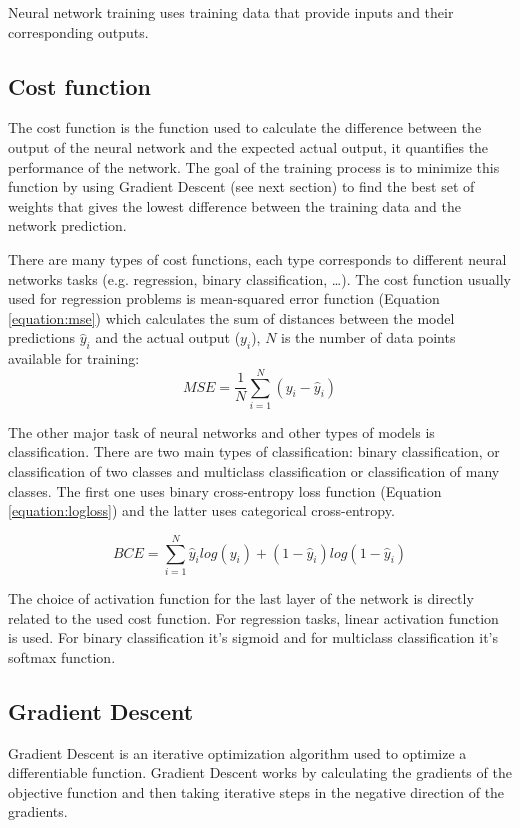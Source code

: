Neural network training uses training data that provide inputs and their corresponding outputs.

\subsection{Cost function}
The cost function is the function used to calculate the difference between the output of the neural network and the expected actual output, it quantifies the performance of the network. The goal of the training process is to minimize this function by using Gradient Descent (see next section) to find the best set of weights that gives the lowest difference between the training data and the network prediction.

There are many types of cost functions, each type corresponds to different neural networks tasks (e.g. regression, binary classification, …). The cost function usually used for regression problems is mean-squared error function (Equation \ref{equation:mse}) which calculates the sum of distances between the model predictions $\hat{y}_i$ and the actual output ($y_i$), $N$ is the number of data points available for training:
\begin{equation}
    MSE=\frac{1}{N}\sum_{i=1}^N(y_i-\hat{y}_i)
    \label{equation:mse}
\end{equation}

The other major task of neural networks and other types of models is classification. There are two main types of classification: binary classification, or classification of two classes and multiclass classification or classification of many classes. The first one uses binary cross-entropy loss function (Equation \ref{equation:logloss}) and the latter uses categorical cross-entropy.

\begin{equation}
    BCE = \sum_{i=1}^{N}\hat{y}_i log(y_i)+(1-\hat{y}_i)log(1-\hat{y}_i)
    \label{equation:logloss}
\end{equation}

The choice of activation function for the last layer of the network is directly related to the used cost function. For regression tasks, linear activation function is used. For binary classification it's sigmoid and for multiclass classification it's softmax function.

\subsection{Gradient Descent}
Gradient Descent is an iterative optimization algorithm used to optimize a differentiable function. Gradient Descent works by calculating the gradients of the objective function and then taking iterative steps in the negative direction of the gradients.

